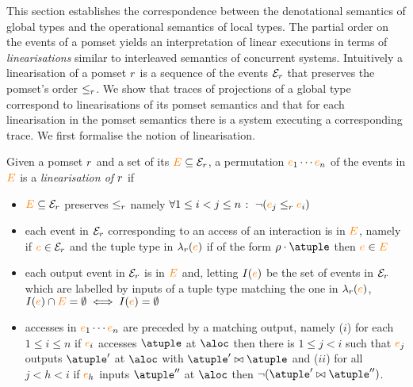 
This section establishes the correspondence between the denotational
semantics of global types and the operational semantics of local
types.
%
The partial order on the events of a pomset yields an interpretation
of linear executions in terms of \emph{linearisations} similar to
interleaved semantics of concurrent systems.
%
Intuitively a linearisation of a pomset $r$ is a sequence of the
events $\mathcal{E}_{r}$ that preserves the pomset's order
$\leq_{r}$.
%
We show that traces of projections of a global type correspond to
linearisations of its pomset semantics and that for each linearisation
in the pomset semantics there is a system executing a corresponding
trace.
%
We first formalise the notion of linearisation.

Given a pomset $r$ and a set of its ${\color{orange}{E}} \subseteq \mathcal{E}_{r}$,
a permutation ${\color{orange}{e}}_1 \cdots {\color{orange}{e}}_n$ of the events in ${\color{orange}{E}}$ is a
\emph{linearisation of $r$} if
\begin{itemize}
\item ${\color{orange}{E}} \subseteq \mathcal{E}_{r}$ preserves $\leq_{r}$ namely
  $\forall 1 \leq i < j \leq n \;\colon\; \neg ({\color{orange}{e}}_j \leq_{r} {\color{orange}{e}}_i)$
\item each event in $\mathcal{E}_{r}$ corresponding to an access of an
  interaction is in ${\color{orange}{E}}$, namely
  if ${\color{orange}{e}} \in \mathcal{E}_{r}$ and the tuple type in $\lambda_{r}({\color{orange}{e}})$
  if of the form $\arole \cdot \atuple$ then ${\color{orange}{e}} \in {\color{orange}{E}}$
\item each output event in $\mathcal{E}_{r}$ is in ${\color{orange}{E}}$ and, letting
  $I({\color{orange}{e}})$ be the set of events in $\mathcal{E}_{r}$ which are labelled
  by inputs of a tuple type matching the one in $\lambda_{r}({\color{orange}{e}})$,
  $I({\color{orange}{e}}) \cap {\color{orange}{E}} = \emptyset \iff I({\color{orange}{e}}) = \emptyset$
\item accesses in ${\color{orange}{e}}_1 \cdots {\color{orange}{e}}_n$ are preceded by a matching
  output, namely ($i$) for each $1 \leq i \leq n$ if ${\color{orange}{e}}_i$ accesses
  $\atuple$ at $\aloc$ then there is $1 \leq j < i$ such that ${\color{orange}{e}}_j$
  outputs $\atuple'$ at $\aloc$ with $\atuple' \matches \atuple$ and
  ($ii$) for all $j < h < i$ if ${\color{orange}{e}}_h$ inputs $\atuple''$ at $\aloc$
  then $\neg (\atuple' \matches \atuple'')$.
\end{itemize}

